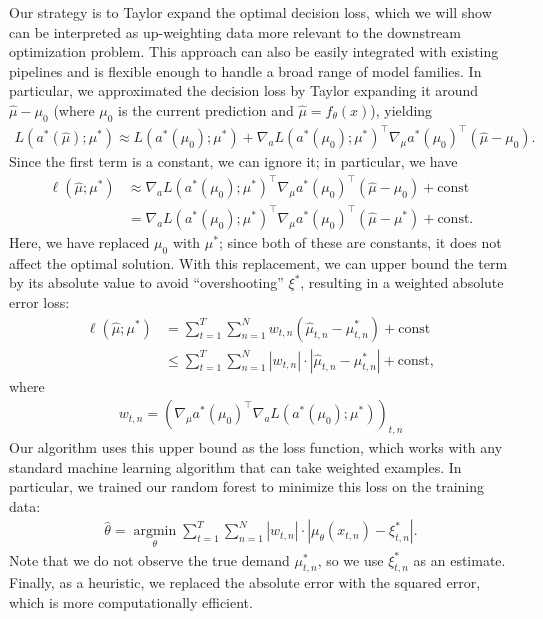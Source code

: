 \documentclass[12pt]{article}
\begin{document}
Our strategy is to Taylor expand the optimal decision loss, which we will show can be interpreted as up-weighting data more relevant to the downstream optimization problem. This approach can also be easily integrated with existing pipelines and is flexible enough to handle a broad range of model families. In particular, we approximated the decision loss by Taylor expanding it around $\hat\mu-\mu_0$ (where $\mu_0$ is the current prediction and $\hat\mu=f_\theta(x)$), yielding
\begin{align}
\label{eqn:taylor}
L(a^*(\hat{\mu});\mu^*)
\approx
L(a^*(\mu_0);\mu^*)
+
\nabla_aL(a^*(\mu_0);\mu^*)^\top\nabla_\mu a^*(\mu_0)^\top(\hat{\mu}-\mu_0).
\end{align}
Since the first term is a constant, we can ignore it; in particular, we have
\begin{align*}
\ell(\hat\mu;\mu^*)
&\approx\nabla_aL(a^*(\mu_0);\mu^*)^\top\nabla_\mu a^*(\mu_0)^\top(\hat\mu-\mu_0)+\text{const} \\
&=\nabla_aL(a^*(\mu_0);\mu^*)^\top\nabla_\mu a^*(\mu_0)^\top(\hat\mu-\mu^*)+\text{const}.
\end{align*}
Here, we have replaced $\mu_0$ with $\mu^*$; since both of these are constants, it does not affect the optimal solution. With this replacement, we can upper bound the term by its absolute value to avoid ``overshooting'' $\xi^*$, resulting in a weighted absolute error loss:
\begin{align*}
\ell(\hat\mu;\mu^*)
&=\sum_{t=1}^T\sum_{n=1}^Nw_{t,n}(\hat\mu_{t,n}-\mu^*_{t,n})+\text{const} \\
&\le\sum_{t=1}^T\sum_{n=1}^N|w_{t,n}|\cdot|\hat\mu_{t,n}-\mu^*_{t,n}|+\text{const},
\end{align*}
where
\begin{align*}
w_{t,n}=\left(\nabla_{\mu}a^*(\mu_0)^\top\nabla_aL(a^*(\mu_0);\mu^*)\right)_{t,n}
\end{align*}
Our algorithm uses this upper bound as the loss function, which works with any standard machine learning algorithm that can take weighted examples. In particular, we trained our random forest to minimize this loss on the training data:
\begin{align*}
\hat\theta=\operatorname*{\arg\min}_{\theta}\sum_{t=1}^T\sum_{n=1}^N|w_{t,n}|\cdot|\mu_{\theta}(x_{t,n})-\xi_{t,n}^*|.
\end{align*}
Note that we do not observe the true demand $\mu_{t,n}^*$, so we use $\xi_{t,n}^*$ as an estimate. Finally, as a heuristic, we replaced the absolute error with the squared error, which is more computationally efficient.
\end{document}
